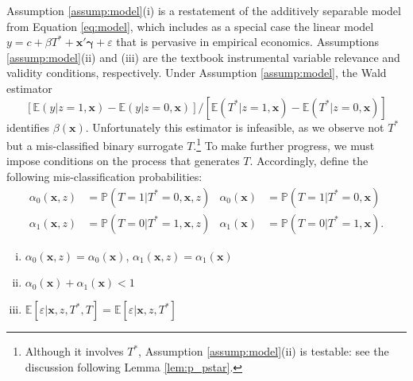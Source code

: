Assumption \ref{assump:model}(i) is a restatement of the additively separable model from Equation \ref{eq:model}, which includes as a special case the linear model $y = c + \beta T^* + \mathbf{x}'\boldsymbol{\gamma} + \varepsilon$ that is pervasive in empirical economics. 
Assumptions \ref{assump:model}(ii) and (iii) are the textbook instrumental variable relevance and validity conditions, respectively.
Under Assumption \ref{assump:model}, the Wald estimator 
\[
  \left[\mathbb{E}\left(y|z=1,\mathbf{x}\right)-\mathbb{E}\left(y|z=0,\mathbf{x}\right)\right] / \left[ \mathbb{E}\left(T^*|z=1,\mathbf{x}\right) - \mathbb{E}\left( T^*|z=0,\mathbf{x} \right) \right]
\] 
identifies $\beta(\mathbf{x})$.
Unfortunately this estimator is infeasible, as we observe not $T^*$ but a mis-classified binary surrogate $T$.\footnote{Although it involves $T^*$, Assumption \ref{assump:model}(ii) is testable: see the discussion following Lemma \ref{lem:p_pstar}.}
To make further progress, we must impose conditions on the process that generates $T$. 
Accordingly, define the following mis-classification probabilities:
\begin{align*}
  \alpha_0(\mathbf{x},z) &= \mathbb{P}\left(T=1|T^*=0,\mathbf{x},z  \right) &
  \alpha_0(\mathbf{x}) &= \mathbb{P}\left(T=1|T^*=0,\mathbf{x}  \right)\\ 
  \alpha_1(\mathbf{x},z) &= \mathbb{P}\left(T=0|T^*=1,\mathbf{x},z  \right) &
  \alpha_1(\mathbf{x}) &= \mathbb{P}\left(T=0|T^*=1,\mathbf{x}  \right).
\end{align*}

\begin{assump} \mbox{}
  \label{assump:misclassification}
  \begin{enumerate}[(i)] 
    \item $\alpha_0(\mathbf{x},z) = \alpha_0(\mathbf{x})$,   $\alpha_1(\mathbf{x},z) = \alpha_1(\mathbf{x})$
    \item $\alpha_0(\mathbf{x}) + \alpha_1(\mathbf{x}) <1$ 
    \item $\mathbb{E}[\varepsilon|\mathbf{x},z,T^*,T] = \mathbb{E}[\varepsilon|\mathbf{x},z, T^*]$
  \end{enumerate}
\end{assump}

